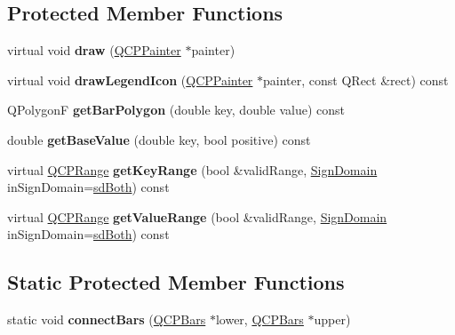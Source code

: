 \subsection*{Protected Member Functions}
\begin{DoxyCompactItemize}
\item 
\hypertarget{classQCPBars_a42b894e34dac799f90ff3700706b31df}{virtual void {\bfseries draw} (\hyperlink{classQCPPainter}{Q\-C\-P\-Painter} $\ast$painter)}\label{classQCPBars_a42b894e34dac799f90ff3700706b31df}

\item 
\hypertarget{classQCPBars_af54543a87581003b3176d8b2931754c5}{virtual void {\bfseries draw\-Legend\-Icon} (\hyperlink{classQCPPainter}{Q\-C\-P\-Painter} $\ast$painter, const Q\-Rect \&rect) const }\label{classQCPBars_af54543a87581003b3176d8b2931754c5}

\item 
\hypertarget{classQCPBars_a1d118a76662cfd691a78c6f573e3f78c}{Q\-Polygon\-F {\bfseries get\-Bar\-Polygon} (double key, double value) const }\label{classQCPBars_a1d118a76662cfd691a78c6f573e3f78c}

\item 
\hypertarget{classQCPBars_ab60a3c4b8e7c59f0f14e25590d96fa4e}{double {\bfseries get\-Base\-Value} (double key, bool positive) const }\label{classQCPBars_ab60a3c4b8e7c59f0f14e25590d96fa4e}

\item 
\hypertarget{classQCPBars_adbf608df1ba1d28c0bc7a929b18d997b}{virtual \hyperlink{classQCPRange}{Q\-C\-P\-Range} {\bfseries get\-Key\-Range} (bool \&valid\-Range, \hyperlink{classQCPAbstractPlottable_a661743478a1d3c09d28ec2711d7653d8}{Sign\-Domain} in\-Sign\-Domain=\hyperlink{classQCPAbstractPlottable_a661743478a1d3c09d28ec2711d7653d8a082b98cfb91a7363a3b5cd17b0c1cd60}{sd\-Both}) const }\label{classQCPBars_adbf608df1ba1d28c0bc7a929b18d997b}

\item 
\hypertarget{classQCPBars_acbcbf97f591d3b8a130b2fdf0a8af74b}{virtual \hyperlink{classQCPRange}{Q\-C\-P\-Range} {\bfseries get\-Value\-Range} (bool \&valid\-Range, \hyperlink{classQCPAbstractPlottable_a661743478a1d3c09d28ec2711d7653d8}{Sign\-Domain} in\-Sign\-Domain=\hyperlink{classQCPAbstractPlottable_a661743478a1d3c09d28ec2711d7653d8a082b98cfb91a7363a3b5cd17b0c1cd60}{sd\-Both}) const }\label{classQCPBars_acbcbf97f591d3b8a130b2fdf0a8af74b}

\end{DoxyCompactItemize}
\subsection*{Static Protected Member Functions}
\begin{DoxyCompactItemize}
\item 
\hypertarget{classQCPBars_a6ea37802cd22f97235cab614b14b9f19}{static void {\bfseries connect\-Bars} (\hyperlink{classQCPBars}{Q\-C\-P\-Bars} $\ast$lower, \hyperlink{classQCPBars}{Q\-C\-P\-Bars} $\ast$upper)}\label{classQCPBars_a6ea37802cd22f97235cab614b14b9f19}

\end{DoxyCompactItemize}
